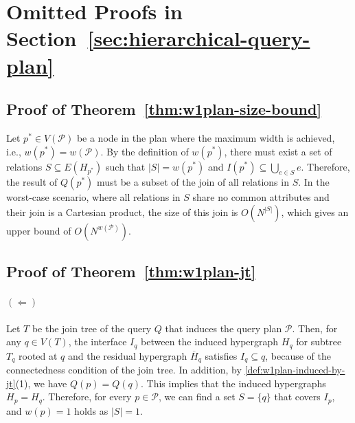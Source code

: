 \section{Omitted Proofs in Section~\ref{sec:hierarchical-query-plan}}
\label{app:hier}

\subsection{Proof of Theorem~\ref{thm:w1plan-size-bound}}

Let $p^* \in V(\mathcal{P})$ be a node in the plan where the maximum width is achieved, i.e., $w(p^*) = w(\mathcal{P})$.  By the definition of $w(p^*)$, there must exist a set of relations $S \subseteq E(H_{p^*})$ such that $|S| = w(p^*)$ and $I(p^*) \subseteq \bigcup_{e \in S} e$.  Therefore, the result of $Q(p^*)$ must be a subset of the join of all relations in $S$.  In the worst-case scenario, where all relations in $S$ share no common attributes and their join is a Cartesian product, the size of this join is $O(N^{|S|})$, which gives an upper bound of $O(N^{w(\mathcal{P})})$.

\subsection{Proof of Theorem~\ref{thm:w1plan-jt}}
    \paragraph{$(\Leftarrow)$}
    Let $T$ be the join tree of the query $Q$ that induces the query plan $\mathcal{P}$. Then, for any $q \in V(T)$, the interface $I_q$ between the induced hypergraph $H_q$ for subtree $T_q$ rooted at $q$ and the residual hypergraph $\overline{H}_q$ satisfies $I_q \subseteq q$, because of the connectedness condition of the join tree.  In addition, by \cref{def:w1plan-induced-by-jt}(1), we have $Q(p) = Q(q)$. This implies that the induced hypergraphs $H_p = H_q$. Therefore, for every $p \in \mathcal{P}$, we can find a set $S = \{q\}$ that covers $I_p$, and $w(p) = 1$ holds as $|S| = 1$.

